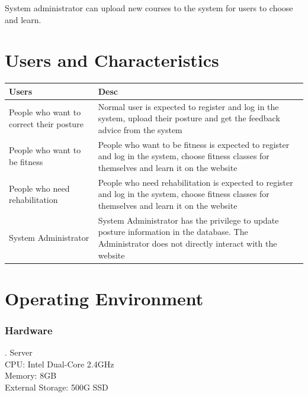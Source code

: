 \documentclass[16pt]{scrreprt}
\begin{document}
System administrator can upload new courses to the system for users to choose and learn.\\

\section{Users and Characteristics}

 
\begin{center}
    \begin{tabular}{p{5cm}p{11cm}}
        \hline
        Users & Desc\\
        \hline
        People who want to correct their posture &  Normal user is expected to register and log in the system, upload their posture and get the feedback advice from the system\\
        \hline
        People who want to be fitness & People who want to be fitness is expected to register and log in the system, choose fitness classes for themselves and learn it on the website\\
        \hline
        People who need rehabilitation & People who need rehabilitation is expected to register and log in the system, choose fitness classes for themselves and learn it on the website\\
        \hline
        System Administrator & System Administrator has the privilege to update posture information in the database. The Administrator does not directly interact with the website\\
        \hline
    \end{tabular}
\end{center}

 
\section{Operating Environment}

 
\subsubsection{Hardware}

 
. Server\\

 
CPU: Intel Dual-Core 2.4GHz\\

 
Memory: 8GB\\

 
External Storage: 500G SSD\\
\end{document}
